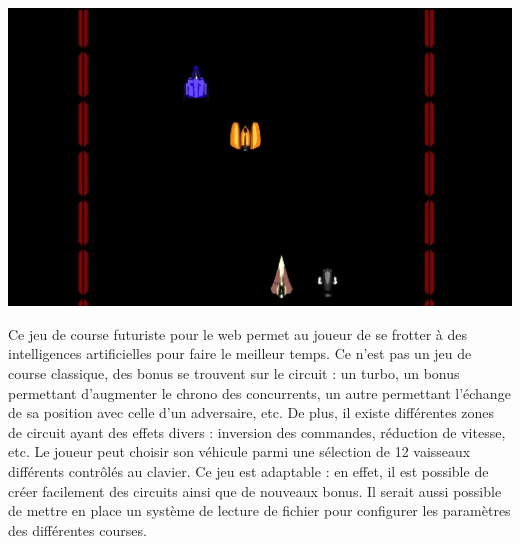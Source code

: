 \clearpage
{}
\begin{minipage}{6cm}
 \includegraphics[width=\linewidth]{img/capturejeu_course}
\end{minipage}
\hfill
\begin{minipage}{9cm}
Ce jeu de course futuriste pour le web permet au joueur de se frotter à des intelligences artificielles pour faire le meilleur temps. 
Ce n’est pas un jeu de course classique, des bonus se trouvent sur le circuit :
un turbo, un bonus permettant d’augmenter le chrono des concurrents, un autre permettant l'échange de sa position avec celle d'un adversaire, etc. 
De plus, il existe différentes zones de circuit ayant des effets divers : inversion des commandes, réduction de vitesse, etc.
Le joueur peut choisir son véhicule parmi une sélection de 12 vaisseaux différents contrôlés au clavier. 
Ce jeu est adaptable : en effet, il est possible de créer facilement des circuits ainsi que de nouveaux bonus. 
Il serait aussi possible de mettre en place un système de lecture de fichier pour configurer les paramètres des différentes courses.
\end{minipage}

